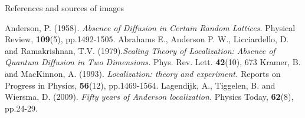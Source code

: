 \documentclass[1pt]{beamer}
\begin{document}
\begin{frame}{References and sources of images}
   
 \begin{thebibliography}{10}
   
 \beamertemplatebookbibitems



   
 \beamertemplatearticlebibitems

Anderson, P. (1958). \emph{Absence of Diffusion in Certain Random Lattices.} Physical Review, \textbf{109}(5), pp.1492-1505.
Abrahams E., Anderson P. W., Licciardello, D. and Ramakrishnan, T.V. (1979).\emph{Scaling Theory of Localization: Absence of Quantum Diffusion in Two Dimensions.} Phys. Rev. Lett. \textbf{42}(10), 673
Kramer, B. and MacKinnon, A. (1993). \emph{Localization: theory and experiment.} Reports on Progress in Physics, \textbf{56}(12), pp.1469-1564.
Lagendijk, A., Tiggelen, B. and Wiersma, D. (2009). \emph{Fifty years of Anderson localization.} Physics Today, \textbf{62}(8), pp.24-29.



 \end{thebibliography}
\end{frame}
\end{document}

